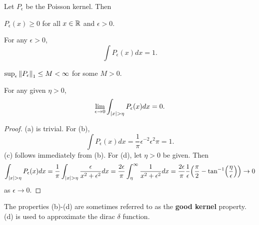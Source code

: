 \begin{proposition}\label{prop:poisson_kernel}
    Let $P_\epsilon$ be the Poisson kernel. Then 
    \begin{thmenum}
        \item $P_\epsilon(x)\geq 0$ for all $x\in\mathbb{R}$ and $\epsilon>0$.
        \item For any $\epsilon>0$,
        \begin{equation*}
            \int P_\epsilon(x)dx = 1.
        \end{equation*}
        \item $\sup_\epsilon\left\lVert {P_\epsilon} \right\rVert_1 \leq M < \infty$ for some $M>0$.
        \item For any given $\eta>0$, 
        \begin{equation*}
            \lim_{\epsilon\to 0}\int_{\left\lvert {x} \right\rvert>\eta}P_\epsilon(x)dx = 0.
        \end{equation*}
    \end{thmenum}
\end{proposition}
\begin{proof}
    (a) is trivial. For (b), 
    \begin{equation*}
        \int P_\epsilon(x)dx = \frac{1}{\pi}\epsilon^{-2}\epsilon^2\pi = 1.
    \end{equation*}
    (c) follows immediately from (b). For (d), let $\eta>0$ be given. 
    Then 
    \begin{equation*}
        \int_{\abs{x}>\eta}P_\epsilon(x)dx = \frac{1}{\pi}\int_{\abs{x}>\eta}\frac{\epsilon}{x^2+\epsilon^2}dx 
        = \frac{2\epsilon}{\pi}\int_{\eta}^\infty\frac{1}{x^2+\epsilon^2}dx 
        = \frac{2\epsilon}{\pi}\frac{1}{\epsilon}\pth{\frac{\pi}{2} - \tan^{-1}\pth{\frac{\eta}{\epsilon}}} 
        \to 0
    \end{equation*}
    as $\epsilon\to 0$.
\end{proof}
\begin{remark}
    The properties (b)-(d) are sometimes referred to as the 
    \textbf{good kernel} property. (d) is used to approximate 
    the dirac $\delta$ function.
\end{remark}

